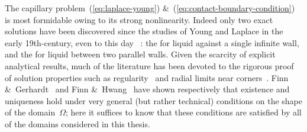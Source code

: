 The capillary problem~(\ref{eq:laplace-young})
\&~(\ref{eq:contact-boundary-condition})
is most formidable owing to its strong nonlinearity.
Indeed only two exact solutions have been discovered
since the studies of Young and Laplace
in the early 19th-century,
even to this day~%
  \cite{anderson-2006-exact-solutions-laplace-young}:
the  for liquid against a single infinite wall,
and the  for liquid between two parallel walls.
Given the scarcity of explicit analytical results,
much of the literature has been devoted
to the rigorous proof of solution properties
such as
regularity~\cite{
  gerhardt-1976-global-regularity-solutions-capillarity,
  gerhardt-1980-free-bvp-capillary-surfaces,
  simon-1980-regularity-capillary-surfaces-corners,
  tam-1986-regularity-capillary-corners-borderline
}
and
radial limits near corners~\cite{
  crenshaw-2018-generalization-radial-limits-bounded,
  entekhabi-2017-radial-limits-capillary-corners,
  lancaster-1996-radial-limits-bounded-capillary,
  lancaster-1997-correction-radial-limits-bounded,
  lancaster-2012-remarks-nonparametric-capillary-corners
}.
Finn \&~Gerhardt~\cite{finn-1977-internal-sphere-condition-capillary}
and Finn \&~Hwang~\cite{finn-1989-comparison-principle-capillary-surfaces}
have shown respectively that existence and uniqueness hold
under very general (but rather technical) conditions
on the shape of the domain~$\Omega$;
here it suffices to know that these conditions are satisfied
by all of the domains considered in this thesis.

